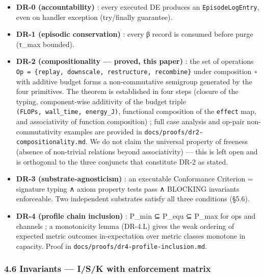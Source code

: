 \documentclass[
]{article}
\providecommand{\tightlist}{%
  \setlength{\itemsep}{0pt}\setlength{\parskip}{0pt}}
\begin{document}
\begin{itemize}
\tightlist
\item
  \textbf{DR-0 (accountability)} : every executed DE produces an
  \texttt{EpisodeLogEntry}, even on handler exception (try/finally
  guarantee).
\item
  \textbf{DR-1 (episodic conservation)} : every β record is consumed
  before purge (τ\_max bounded).
\item
  \textbf{DR-2 (compositionality --- proved, this paper)} : the set of
  operations
  \texttt{Op\ =\ \{replay,\ downscale,\ restructure,\ recombine\}} under
  composition \texttt{∘} with additive budget forms a non-commutative
  semigroup generated by the four primitives. The theorem is established
  in four steps (closure of the typing, component-wise additivity of the
  budget triple \texttt{(FLOPs,\ wall\_time,\ energy\_J)}, functional
  composition of the \texttt{effect} map, and associativity of function
  composition) ; full case analysis and op-pair non-commutativity
  examples are provided in \texttt{docs/proofs/dr2-compositionality.md}.
  We do not claim the universal property of freeness (absence of
  non-trivial relations beyond associativity) --- this is left open and
  is orthogonal to the three conjuncts that constitute DR-2 as stated.
\item
  \textbf{DR-3 (substrate-agnosticism)} : an executable Conformance
  Criterion = signature typing ∧ axiom property tests pass ∧ BLOCKING
  invariants enforceable. Two independent substrates satisfy all three
  conditions (§5.6).
\item
  \textbf{DR-4 (profile chain inclusion)} : P\_min ⊆ P\_equ ⊆ P\_max for
  ops and channels ; a monotonicity lemma (DR-4.L) gives the weak
  ordering of expected metric outcomes in-expectation over metric
  classes monotone in capacity. Proof in
  \texttt{docs/proofs/dr4-profile-inclusion.md}.
\end{itemize}

\subsubsection{4.6 Invariants --- I/S/K with enforcement
matrix}\label{invariants-isk-with-enforcement-matrix}
\end{document}
